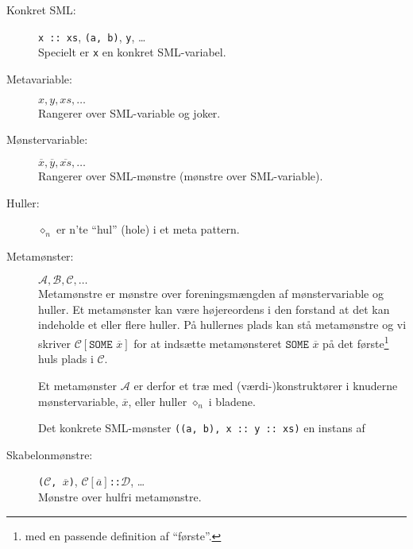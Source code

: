 \documentclass[oneside]{memoir}
\theoremstyle{definition}
\begin{document}
\begin{description}
\item[Konkret SML:] \texttt{x :: xs}, \texttt{(a, b)}, \texttt{y}, \ldots\\
  Specielt er \texttt{x} en konkret SML-variabel.
\item[Metavariable:] $x, y, xs, \ldots$\\
  Rangerer over SML-variable og joker.
\item[Mønstervariable:] $\overline{x}, \overline{y}, \overline{xs}, \ldots$\\
  Rangerer over SML-mønstre (mønstre over SML-variable).
\item[Huller:] $\diamond_n$ er n'te "`hul"' (hole) i et meta pattern.
\item[Metamønster:] $\mathcal{A}, \mathcal{B}, \mathcal{C}, \ldots$\\
  Metamønstre er mønstre over foreningsmængden af mønstervariable og huller.
  Et metamønster kan være højereordens i den forstand at det kan indeholde et
  eller flere huller. På hullernes plads kan stå metamønstre og vi skriver
  $\mathcal{C}[\texttt{SOME } \overline{x}]$ for at indsætte metamønsteret
  $\texttt{SOME } \overline{x}$ på det første\footnote{med en passende
    definition af ``første''.} huls plads i $\mathcal{C}$.

  Et metamønster $\mathcal{A}$ er derfor et træ med (værdi-)konstruktører i
  knuderne mønstervariable, $\overline{x}$, eller huller $\diamond_n$ i bladene.

  Det konkrete SML-mønster \texttt{((a,\ b),\ x\ ::\ y\ ::\ xs)} en instans af


\item[Skabelonmønstre:] \texttt{($\mathcal{C}$, $\overline{x}$)},
  \texttt{$\mathcal{C}[\overline{a}]$::$\mathcal{D}$}, \ldots\\
  Mønstre over hulfri metamønstre.


\end{description}
\end{document}
